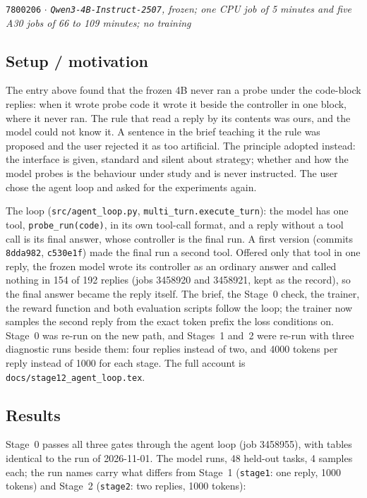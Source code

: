 \documentclass[11pt,a4paper]{article}
\newcommand{\commit}[1]{\texttt{\textcolor{commitgray}{#1}}}
\begin{document}
\commit{7800206} $\cdot$ \textit{\texttt{Qwen3-4B-Instruct-2507}, frozen; one
CPU job of 5 minutes and five A30 jobs of 66 to 109 minutes; no training}

\subsection*{Setup / motivation}

The entry above found that the frozen 4B never ran a probe under the
code-block replies: when it wrote probe code it wrote it beside the
controller in one block, where it never ran. The rule that read a reply by
its contents was ours, and the model could not know it. A sentence in the
brief teaching it the rule was proposed and the user rejected it as too
artificial. The principle adopted instead: the interface is given, standard
and silent about strategy; whether and how the model probes is the
behaviour under study and is never instructed. The user chose the agent
loop and asked for the experiments again.

\begin{sloppypar}
The loop (\texttt{src/agent\_loop.py}, \texttt{multi\_turn.execute\_turn}):
the model has one tool, \texttt{probe\_run(code)}, in its own tool-call
format, and a reply without a tool call is its final answer, whose
controller is the final run. A first version (commits \texttt{8dda982},
\texttt{c530e1f}) made the final run a second tool. Offered only that tool
in one reply, the frozen model wrote its controller as an ordinary answer
and called nothing in 154 of 192 replies (jobs 3458920 and 3458921, kept as
the record), so the final answer became the reply itself. The brief, the
Stage~0 check, the trainer, the reward function and both evaluation scripts
follow the loop; the trainer now samples the second reply from the exact
token prefix the loss conditions on. Stage~0 was re-run on the new path, and
Stages~1 and~2 were re-run with three diagnostic runs beside them: four
replies instead of two, and 4000 tokens per reply instead of 1000 for each
stage. The full account is \texttt{docs/stage12\_agent\_loop.tex}.
\end{sloppypar}

\subsection*{Results}

Stage~0 passes all three gates through the agent loop (job 3458955), with
tables identical to the run of 2026-11-01. The model runs, 48 held-out
tasks, 4 samples each; the run names carry what differs from Stage~1
(\texttt{stage1}: one reply, 1000 tokens) and Stage~2 (\texttt{stage2}: two
replies, 1000 tokens):
\end{document}
